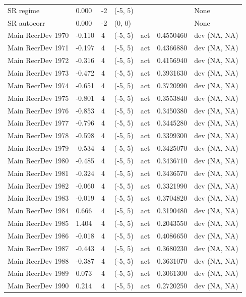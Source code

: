 \documentclass[
  english,
  a4paper,
]{article}
\begin{document}
\begin{landscape}
\begin{longtable}[t]{>{\raggedright\arraybackslash}p{8.5cm}lllll>{\raggedright\arraybackslash}p{4cm}}
SR regime & 0.000 & -2 & (-5, 5) &  &  & None\\
SR autocorr & 0.000 & -2 & (0, 0) &  &  & None\\
Main RecrDev 1970 & -0.110 & 4 & (-5, 5) & act & 0.4550460 & dev (NA, NA)\\
Main RecrDev 1971 & -0.197 & 4 & (-5, 5) & act & 0.4366880 & dev (NA, NA)\\
Main RecrDev 1972 & -0.316 & 4 & (-5, 5) & act & 0.4156940 & dev (NA, NA)\\
Main RecrDev 1973 & -0.472 & 4 & (-5, 5) & act & 0.3931630 & dev (NA, NA)\\
Main RecrDev 1974 & -0.651 & 4 & (-5, 5) & act & 0.3720990 & dev (NA, NA)\\
Main RecrDev 1975 & -0.801 & 4 & (-5, 5) & act & 0.3553840 & dev (NA, NA)\\
Main RecrDev 1976 & -0.853 & 4 & (-5, 5) & act & 0.3450380 & dev (NA, NA)\\
Main RecrDev 1977 & -0.796 & 4 & (-5, 5) & act & 0.3445280 & dev (NA, NA)\\
Main RecrDev 1978 & -0.598 & 4 & (-5, 5) & act & 0.3399300 & dev (NA, NA)\\
Main RecrDev 1979 & -0.534 & 4 & (-5, 5) & act & 0.3425070 & dev (NA, NA)\\
Main RecrDev 1980 & -0.485 & 4 & (-5, 5) & act & 0.3436710 & dev (NA, NA)\\
Main RecrDev 1981 & -0.324 & 4 & (-5, 5) & act & 0.3436570 & dev (NA, NA)\\
Main RecrDev 1982 & -0.060 & 4 & (-5, 5) & act & 0.3321990 & dev (NA, NA)\\
Main RecrDev 1983 & -0.019 & 4 & (-5, 5) & act & 0.3704820 & dev (NA, NA)\\
Main RecrDev 1984 & 0.666 & 4 & (-5, 5) & act & 0.3190480 & dev (NA, NA)\\
Main RecrDev 1985 & 1.404 & 4 & (-5, 5) & act & 0.2043550 & dev (NA, NA)\\
Main RecrDev 1986 & -0.018 & 4 & (-5, 5) & act & 0.4086650 & dev (NA, NA)\\
Main RecrDev 1987 & -0.443 & 4 & (-5, 5) & act & 0.3680230 & dev (NA, NA)\\
Main RecrDev 1988 & -0.387 & 4 & (-5, 5) & act & 0.3631070 & dev (NA, NA)\\
Main RecrDev 1989 & 0.073 & 4 & (-5, 5) & act & 0.3061300 & dev (NA, NA)\\
Main RecrDev 1990 & 0.214 & 4 & (-5, 5) & act & 0.2720250 & dev (NA, NA)\\

\end{longtable}
\end{landscape}
\end{document}

